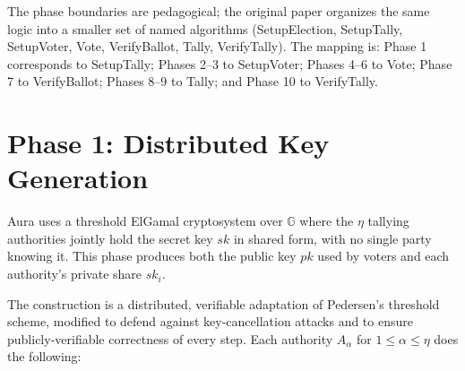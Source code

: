 \documentclass[12pt,a4paper,oneside]{report}
\begin{document}
The phase boundaries are pedagogical; the original paper organizes the 
same logic into a smaller set of named algorithms (\textsf{SetupElection}, 
\textsf{SetupTally}, \textsf{SetupVoter}, \textsf{Vote}, \textsf{VerifyBallot}, 
\textsf{Tally}, \textsf{VerifyTally}). The mapping is: Phase 1 corresponds 
to \textsf{SetupTally}; Phases 2--3 to \textsf{SetupVoter}; Phases 4--6 
to \textsf{Vote}; Phase 7 to \textsf{VerifyBallot}; Phases 8--9 to 
\textsf{Tally}; and Phase 10 to \textsf{VerifyTally}.

\section{Phase 1: Distributed Key Generation}
\label{sec:phase-1-dkg}

Aura uses a threshold ElGamal cryptosystem over $\mathbb{G}$ where the 
$\eta$ tallying authorities jointly hold the secret key $sk$ in shared 
form, with no single party knowing it. This phase produces both the 
public key $pk$ used by voters and each authority's private share $sk_i$.

The construction is a distributed, verifiable adaptation of Pedersen's 
threshold scheme, modified to defend against key-cancellation attacks 
and to ensure publicly-verifiable correctness of every step. Each 
authority $A_\alpha$ for $1 \le \alpha \le \eta$ does the following:
\end{document}
